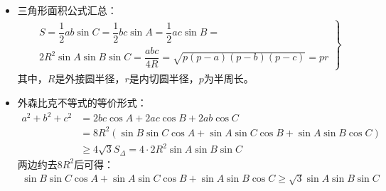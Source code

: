 \begin{itemize}[leftmargin=\inteval{\myitemleftmargin}pt,itemsep=
   \inteval{\myitemitempsep}pt,topsep=\inteval{\myitemtopsep}pt]
\item 三角形面积公式汇总：
\begin{gather}\label{三角形面积公式汇总}
    \left.    
    \begin{gathered}
        S=\dfrac{1}{2}ab\sin C=\dfrac{1}{2}bc\sin A=\dfrac{1}{2}ac\sin B=\\ 
        2R^2\sin A\sin B\sin C=\dfrac{abc}{4R}=\sqrt{p(p-a)(p-b)(p-c)}=pr
    \end{gathered} \right\}
\end{gather}
其中，$ R $是外接圆半径，$ r $是内切圆半径，$ p $为半周长。

\item 外森比克不等式的等价形式：
\begin{align*}
    a^2+b^2+c^2 &=2bc\cos A+2ac\cos B+2ab\cos C \\
    &=8R^2(\sin B\sin C\cos A+\sin A\sin C\cos B+\sin A\sin B\cos C) \\
    &\geq 4\sqrt{3}S_{\Delta}=4\cdot 2R^2\sin A\sin B\sin C
\end{align*}
两边约去$ 8R^2 $后可得：
\begin{gather*}
    \sin B\sin C\cos A+\sin A\sin C\cos B+\sin A\sin B\cos C
    \geq \sqrt{3} \sin A\sin B\sin C
\end{gather*}


\end{itemize}
